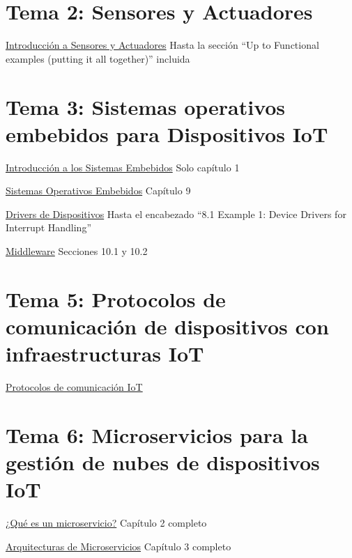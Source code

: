 \documentclass[12pt, twoside, openright]{report} %
\begin{document}
\section{Tema 2: Sensores y Actuadores}
\href{https://learning.oreilly.com/library/view/internet-of-things/9781788470599/d39be056-b166-476e-868e-c415e4dfa886.xhtml}{Introducción a Sensores y Actuadores} Hasta la sección “Up to Functional examples (putting it all together)” incluida

\section{Tema 3: Sistemas operativos embebidos para Dispositivos IoT}
\href{https://learning.oreilly.com/library/view/embedded-systems-architecture/9780123821966/xhtml/CHP001.html#CHP001titl}{Introducción a los Sistemas Embebidos} Solo capítulo 1

\href{https://learning.oreilly.com/library/view/embedded-systems-architecture/9780123821966/xhtml/CHP009.html#CHP009titl}{Sistemas Operativos Embebidos} Capítulo 9

\href{https://learning.oreilly.com/library/view/embedded-systems-architecture/9780123821966/xhtml/CHP008.html#CHP008titl}{Drivers de Dispositivos} Hasta el encabezado “8.1 Example 1: Device Drivers for Interrupt Handling”

\href{https://learning.oreilly.com/library/view/embedded-systems-architecture/9780123821966/xhtml/CHP010.html#CHP010titl}{Middleware} Secciones 10.1 y 10.2

\section{Tema 5: Protocolos de comunicación de dispositivos con infraestructuras IoT}
\href{https://learning.oreilly.com/library/view/internet-of-things/9781788470599/b34f5cd8-115c-490c-b5c2-38a3a966a65a.xhtml}{Protocolos de comunicación IoT}

\section{Tema 6: Microservicios para la gestión de nubes de dispositivos IoT}
\href{https://learning.oreilly.com/library/view/microservices-iot-and/9781484212752/9781484212769_Ch02.xhtml}{¿Qué es un microservicio?} Capítulo 2 completo

\href{https://learning.oreilly.com/library/view/microservices-iot-and/9781484212752/9781484212769_Ch03.xhtml}{Arquitecturas de Microservicios} Capítulo 3 completo
\end{document}
